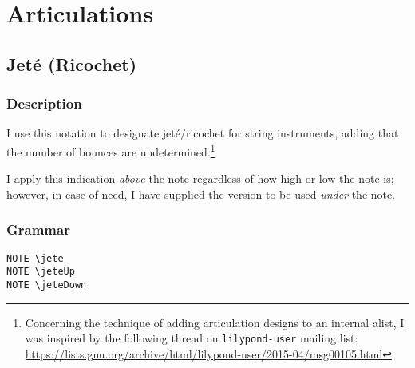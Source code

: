 


\chapter {Articulations}

\section {Jeté (Ricochet)}
\hfill
{}
\hfill

\subsection{Description}
I use this notation to designate jeté/ricochet for string instruments, adding that the number of bounces are undetermined.\footnote{Concerning the technique of adding articulation designs to an internal alist, I was inspired by the following thread on \Verb|lilypond-user| mailing list: \url{https://lists.gnu.org/archive/html/lilypond-user/2015-04/msg00105.html}}  

I apply this indication \textit{above} the note regardless of how high or low the note is; however, in case of need, I have supplied the version to be used \textit{under} the note.
\subsection{Grammar}
\begin{verbatim}
NOTE \jete
NOTE \jeteUp
NOTE \jeteDown
\end{verbatim}
